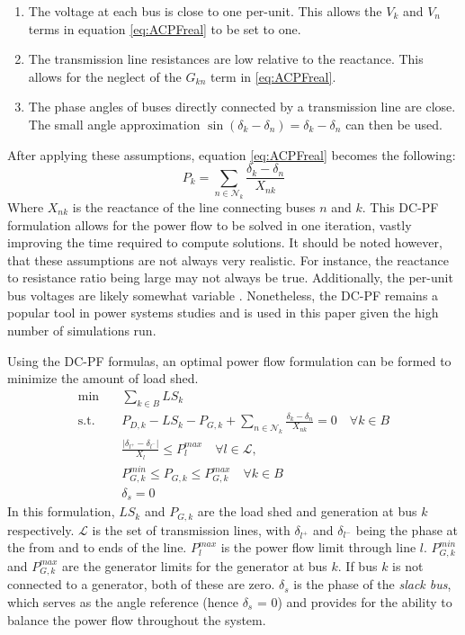 \documentclass[12pt]{article}
\begin{document}
\begin{enumerate}
  \item The voltage at each bus is close to one per-unit. This allows the $V_k$ and $V_n$ terms in equation \eqref{eq:ACPFreal} to be set to one.
  \item The transmission line resistances are low relative to the reactance. This allows for the neglect of the $G_{kn}$ term in \eqref{eq:ACPFreal}.
  \item The phase angles of buses directly connected by a transmission line are close. The small angle approximation $\sin(\delta_k - \delta_n) = \delta_k - \delta_n$ can then be used. 
\end{enumerate}
After applying these assumptions, equation \eqref{eq:ACPFreal}  becomes the following:
\begin{equation} 
    P_k = \sum_{ n \in \mathcal{N}_k }\frac{\delta_k - \delta_n}{X_{nk}}
    \label{eq:DCPF}
\end{equation}
Where $X_{nk}$ is the reactance of the line connecting buses $n$ and $k$. This DC-PF formulation allows for the power flow to be solved in one iteration, vastly improving the time required to compute solutions. It should be noted however, that these assumptions are not always very realistic. For instance, the reactance to resistance ratio being large may not always be true. Additionally, the per-unit bus voltages are likely somewhat variable \cite{purchala2005}. Nonetheless, the DC-PF remains a popular tool in power systems studies \cite{purchala2005} and is used in this paper given the high number of simulations run. \par
Using the DC-PF formulas, an optimal power flow formulation can be formed to minimize the amount of load shed. 
\begin{align}
    \min \quad & \sum_{k\in B}LS_k \\  
    \text{s.t.} \quad & P_{D, k} - LS_k - P_{G, k} +\sum_{ n \in \mathcal{N}_k }\frac{\delta_k - \delta_n}{X_{nk}} = 0 \quad\forall k\in B \label{powerbalance} \\  
                      & \frac{|\delta_{l^+} - \delta_{l^-}|}{X_{l}} \leq P_{l}^{max} \quad\forall l\in \mathcal{L}, \\  
                      & P_{G, k}^{min}\leq P_{G,k} \leq P_{G, k}^{max} \quad \forall k\in B \\
                      & \delta_s = 0
\end{align}	
In this formulation, $LS_k$ and $P_{G, k}$  are the load shed and generation at bus $k$ respectively. $\mathcal{L}$ is the set of transmission lines, with $\delta_{l^+}$ and $\delta_{l^-}$ being the phase at the from and to ends of the line. $P_{l}^{max}$ is the power flow limit through line $l$.   $P _{G, k}^{min}$ and $P _{G, k}^{max}$ are the generator limits for the generator at bus $k$. If bus $k$ is not connected to a generator, both of these are zero. $\delta_s$ is the phase of the \textit{slack bus}, which serves as the angle reference (hence $\delta_s$ = 0) and provides for the ability to balance the power flow throughout the system. \par
\end{document}

